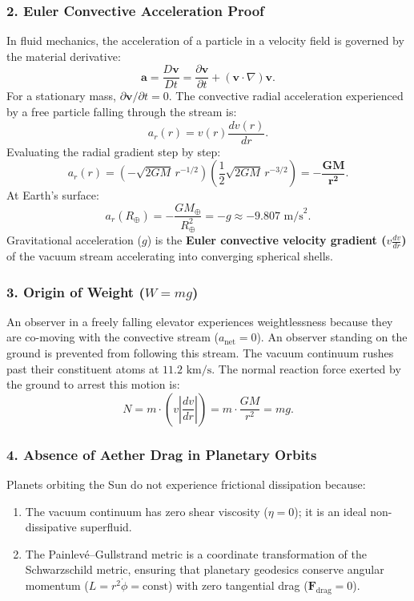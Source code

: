 \subsubsection{2. Euler Convective Acceleration Proof}
In fluid mechanics, the acceleration of a particle in a velocity field is governed by the material derivative:
\begin{equation}
    \mathbf{a} = \frac{D\mathbf{v}}{Dt} = \frac{\partial \mathbf{v}}{\partial t} + (\mathbf{v} \cdot \nabla)\mathbf{v}.
\end{equation}
For a stationary mass, $\partial \mathbf{v}/\partial t = 0$. The convective radial acceleration experienced by a free particle falling through the stream is:
\begin{equation}
    a_r(r) = v(r) \frac{dv(r)}{dr}.
    \label{eq:konvektif_ivme_tanim}
\end{equation}
Evaluating the radial gradient step by step:
\begin{equation}
    a_r(r) = \left( -\sqrt{2GM} \, r^{-1/2} \right) \left( \frac{1}{2} \sqrt{2GM} \, r^{-3/2} \right) = \mathbf{-\frac{GM}{r^2}}.
    \label{eq:g_ispat_sonuc}
\end{equation}
At Earth's surface:
\begin{equation}
    a_r(R_\oplus) = -\frac{GM_\oplus}{R_\oplus^2} = -g \approx -9.807\text{ m/s}^2.
\end{equation}
Gravitational acceleration ($g$) is the \textbf{Euler convective velocity gradient ($v \frac{dv}{dr}$)} of the vacuum stream accelerating into converging spherical shells.

\subsubsection{3. Origin of Weight ($W = mg$)}
An observer in a freely falling elevator experiences weightlessness because they are co-moving with the convective stream ($a_{\mathrm{net}} = 0$). An observer standing on the ground is prevented from following this stream. The vacuum continuum rushes past their constituent atoms at $11.2\text{ km/s}$. The normal reaction force exerted by the ground to arrest this motion is:
\begin{equation}
    N = m \cdot \left( v \left|\frac{dv}{dr}\right| \right) = m \cdot \frac{GM}{r^2} = mg.
\end{equation}

\subsubsection{4. Absence of Aether Drag in Planetary Orbits}
Planets orbiting the Sun do not experience frictional dissipation because:
\begin{enumerate}
    \item The vacuum continuum has zero shear viscosity ($\eta = 0$); it is an ideal non-dissipative superfluid.
    \item The Painlevé--Gullstrand metric is a coordinate transformation of the Schwarzschild metric, ensuring that planetary geodesics conserve angular momentum ($L = r^2 \dot{\phi} = \text{const}$) with zero tangential drag ($\mathbf{F}_{\mathrm{drag}} = 0$).
\end{enumerate}

